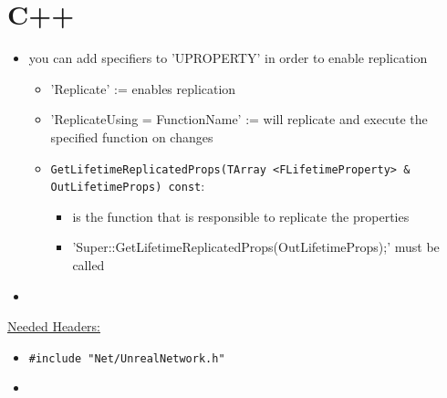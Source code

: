     \section{C++}
        \begin{itemize}
            \item you can add specifiers to 'UPROPERTY' in order to enable replication
            \begin{itemize}
                \item 'Replicate' := enables replication
                \item 'ReplicateUsing = FunctionName' := will replicate and execute the specified function on changes
                \item \colorbox{mygray}{\lstinline{GetLifetimeReplicatedProps(TArray <FLifetimeProperty> & OutLifetimeProps) const}}:
                \begin{itemize}
                    \item is the function that is responsible to replicate the properties
                    \item 'Super::GetLifetimeReplicatedProps(OutLifetimeProps);' must be called
                \end{itemize}
            \end{itemize}
            \item 
        \end{itemize}

        \uline{Needed Headers:}
        \begin{itemize}
            \item \colorbox{mygray}{\lstinline{#include "Net/UnrealNetwork.h"}}
            \item 
        \end{itemize}


